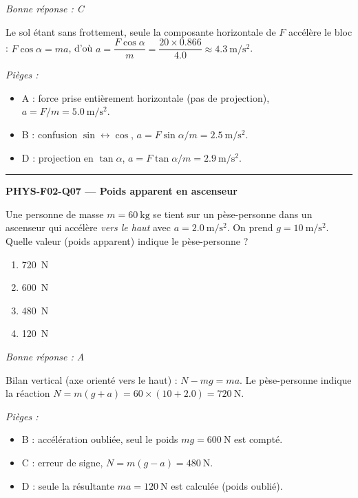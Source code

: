 \documentclass[11pt,a4paper]{article}
\newcommand{\vv}[1]{\vec{#1}}\newcommand{\ds}{\displaystyle}
\begin{document}
\textit{Bonne réponse : C}\par
Le sol étant sans frottement, seule la composante horizontale de $F$ accélère le bloc : $F\cos\alpha=ma$, d'où $a=\dfrac{F\cos\alpha}{m}=\dfrac{20\times\num{0.866}}{\num{4.0}}\approx\qty{4.3}{\metre\per\second\squared}$.\par
\textit{Pièges :}
\begin{itemize}
\item A : force prise entièrement horizontale (pas de projection), $a=F/m=\qty{5.0}{\metre\per\second\squared}$.
\item B : confusion $\sin\leftrightarrow\cos$, $a=F\sin\alpha/m=\qty{2.5}{\metre\per\second\squared}$.
\item D : projection en $\tan\alpha$, $a=F\tan\alpha/m=\qty{2.9}{\metre\per\second\squared}$.
\end{itemize}
\vspace{8pt}\hrule\vspace{8pt}
\noindent\textbf{PHYS-F02-Q07 --- Poids apparent en ascenseur}\par
Une personne de masse $m=\qty{60}{\kilogram}$ se tient sur un pèse-personne dans un ascenseur qui accélère \emph{vers le haut} avec $a=\qty{2.0}{\metre\per\second\squared}$. On prend $g=\qty{10}{\metre\per\second\squared}$. Quelle valeur (poids apparent) indique le pèse-personne ?
\begin{center}
\end{center}
\begin{enumerate}[label=\Alph*)]
\item \qty{720}{\newton}
\item \qty{600}{\newton}
\item \qty{480}{\newton}
\item \qty{120}{\newton}
\end{enumerate}
\textit{Bonne réponse : A}\par
Bilan vertical (axe orienté vers le haut) : $N-mg=ma$. Le pèse-personne indique la réaction $N=m(g+a)=60\times(10+\num{2.0})=\qty{720}{\newton}$.\par
\textit{Pièges :}
\begin{itemize}
\item B : accélération oubliée, seul le poids $mg=\qty{600}{\newton}$ est compté.
\item C : erreur de signe, $N=m(g-a)=\qty{480}{\newton}$.
\item D : seule la résultante $ma=\qty{120}{\newton}$ est calculée (poids oublié).
\end{itemize}
\end{document}
